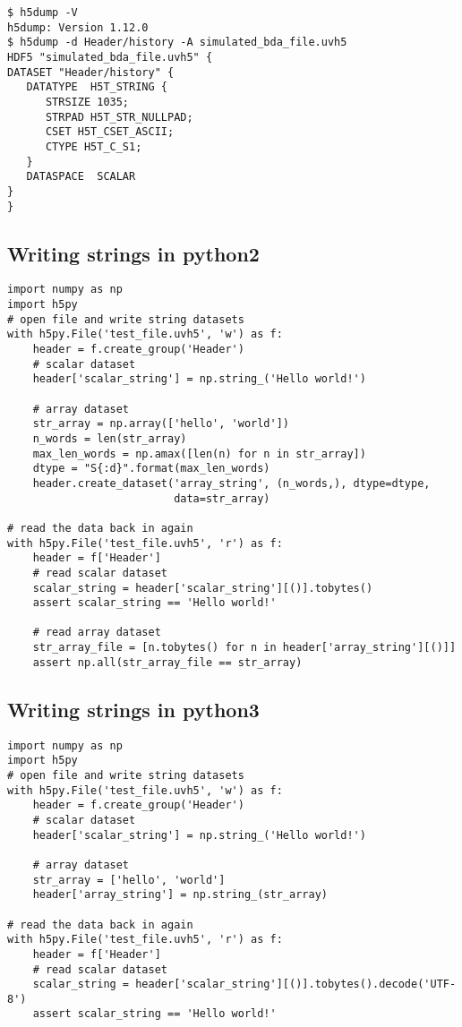 \documentclass[11pt, oneside]{article}
\begin{document}
\begin{appendices}
\begin{verbatim}
$ h5dump -V
h5dump: Version 1.12.0
$ h5dump -d Header/history -A simulated_bda_file.uvh5
HDF5 "simulated_bda_file.uvh5" {
DATASET "Header/history" {
   DATATYPE  H5T_STRING {
      STRSIZE 1035;
      STRPAD H5T_STR_NULLPAD;
      CSET H5T_CSET_ASCII;
      CTYPE H5T_C_S1;
   }
   DATASPACE  SCALAR
}
}
\end{verbatim}

\subsection{Writing strings in python2}
\begin{verbatim}
import numpy as np
import h5py
# open file and write string datasets
with h5py.File('test_file.uvh5', 'w') as f:
    header = f.create_group('Header')
    # scalar dataset
    header['scalar_string'] = np.string_('Hello world!')

    # array dataset
    str_array = np.array(['hello', 'world'])
    n_words = len(str_array)
    max_len_words = np.amax([len(n) for n in str_array])
    dtype = "S{:d}".format(max_len_words)
    header.create_dataset('array_string', (n_words,), dtype=dtype,
                          data=str_array)

# read the data back in again
with h5py.File('test_file.uvh5', 'r') as f:
    header = f['Header']
    # read scalar dataset
    scalar_string = header['scalar_string'][()].tobytes()
    assert scalar_string == 'Hello world!'

    # read array dataset
    str_array_file = [n.tobytes() for n in header['array_string'][()]]
    assert np.all(str_array_file == str_array)
\end{verbatim}

\subsection{Writing strings in python3}
\begin{verbatim}
import numpy as np
import h5py
# open file and write string datasets
with h5py.File('test_file.uvh5', 'w') as f:
    header = f.create_group('Header')
    # scalar dataset
    header['scalar_string'] = np.string_('Hello world!')

    # array dataset
    str_array = ['hello', 'world']
    header['array_string'] = np.string_(str_array)

# read the data back in again
with h5py.File('test_file.uvh5', 'r') as f:
    header = f['Header']
    # read scalar dataset
    scalar_string = header['scalar_string'][()].tobytes().decode('UTF-8')
    assert scalar_string == 'Hello world!'


\end{verbatim}
\end{appendices}
\end{document}
